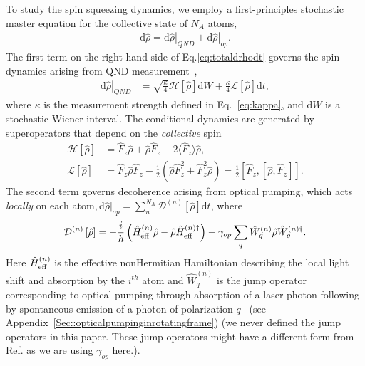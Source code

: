 \documentclass[preprint,aps,pra,onecolumn,superscriptaddress]{revtex4-1} %
\newcommand{\expect}[1]{\big\langle #1 \big\rangle}
\newcommand{\comment}[1]{{\color{Maroon} #1}}
\begin{document}
To study the spin squeezing dynamics, we employ a first-principles stochastic master equation for the collective state of $N_A$ atoms,
\begin{align}\label{eq:totaldrhodt}
\mathrm{d}\hat{\rho}= \left.\mathrm{d}\hat{\rho}\right|_{QND}+\left.\mathrm{d}\hat{\rho}\right|_{op}.
\end{align}
The first term on the right-hand side of Eq.\eqref{eq:totaldrhodt} governs the spin dynamics arising from QND measurement~\cite{Jacobs2006,Baragiola2014},
\begin{align}
\left.\mathrm{d}\hat{\rho}\right|_{QND} &= \sqrt{\frac{\kappa}{4}}\mathcal{H}\left[\hat{\rho} \right]\mathrm{d}W + \frac{\kappa}{4}\mathcal{L}\left[ \hat{\rho}\right]\mathrm{d}t, 
\end{align}
where  $\kappa$ is the measurement strength defined in Eq.~\eqref{eq:kappa}, and $\mathrm{d}W$ is a stochastic Wiener interval. The conditional dynamics are generated by superoperators that depend on the {\em collective} spin
\begin{subequations}
\begin{align}
\mathcal{H}\left[ \hat{\rho}\right] &= \hat{F}_z \hat{\rho} + \hat{\rho}\hat{F}_z -2\expect{\hat{F}_z}\hat{\rho}, \\
\mathcal{L}\left[ \hat{\rho} \right] &= \hat{F}_z \hat{\rho}\hat{F}_z -\frac{1}{2}\left(\hat{\rho}\hat{F}_z^2+\hat{F}_z^2\hat{\rho} \right)=\frac{1}{2}\left[\hat{F}_z,\left[\hat{\rho},\hat{F}_z \right] \right].
\end{align}
\end{subequations}
The second term governs decoherence arising from optical pumping, which acts {\em locally} on each atom$,\mathrm{d}\hat{\rho}|_{op}=\sum_n^{N_A} \mathcal{D}^{(n)}\left[ \hat{\rho}\right] \mathrm{d}t$, where 
\begin{equation}
\mathcal{D}^{(n)}\left[ \hat{\rho}\right] = -\frac{i}{\hbar}\left(\hat{H}^{(n)}_{\rm eff}\hat{\rho} - \hat{\rho} \hat{H}^{(n)\dag}_{\rm eff}\right) + \gamma_{op} \sum_q \hat{W}^{(n)}_q \hat{\rho}\hat{W}^{(n)\dag}_q.
\label{op_superator}
\end{equation}
Here $\hat{H}^{(n)}_{\rm eff}$ is the effective nonHermitian Hamiltonian describing the local light shift and absorption by the $i^{th}$ atom and $\hat{W}^{(n)}_q$ is the jump operator corresponding to optical pumping through absorption of a laser photon following by spontaneous emission of a photon of polarization $q$~\cite{Deutsch2010a} (see Appendix~\ref{Sec::opticalpumpinginrotatingframe}) \comment{(we never defined the jump operators in this paper. These jump operators might have a different form from Ref.\cite{Deutsch2010a} as we are using $ \gamma_{op} $ here.)}.   
\end{document}
